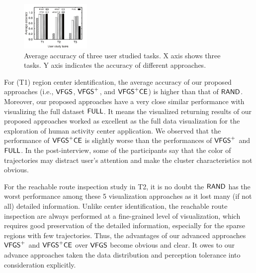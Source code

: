 \begin{figure}[t]
	\centering
	\includegraphics[width=0.3\textwidth]{pictures/userstudy}
	\vspace{-4mm}
	\caption{Average accuracy of three user studied tasks. X axis shows three tasks. Y axis indicates the accuracy of different approaches.}
	\label{fig:accuracy}
	\vspace{-6mm}
\end{figure}

For (T1) region center identification, the average accuracy of our proposed approaches (i.e., $\mathsf{VFGS}$, $\mathsf{VFGS}^{+}$, and $\mathsf{VFGS}^{+}\mathsf{CE}$) is higher than that of $\mathsf{RAND}{}$.
Moreover, our proposed approaches have a very close similar performance with visualizing the full dataset $\mathsf{FULL}$.
It means the visualized returning results of our proposed approaches worked as excellent as the full data visualization for the exploration of human activity center application.
We observed that the performance of $\mathsf{VFGS}^{+}\mathsf{CE}$ is slightly worse than the performances of $\mathsf{VFGS}^{+}$ and $\mathsf{FULL}$.
In the post-interview, some of the participants say that the color of trajectories may distract user's attention and make the cluster characteristics not obvious.



For the reachable route inspection study in T2, it is no doubt the $\mathsf{RAND}$ has the worst performance among these 5 visualization approaches as it lost many (if not all) detailed information.
Unlike center identification, the reachable route inspection are always performed at a fine-grained level of visualization,
which requires good preservation of the detailed information, especially for the sparse regions with few trajectories.
Thus, the advantages of our advanced approaches $\mathsf{VFGS}^{+}$ and $\mathsf{VFGS}^{+}\mathsf{CE}$ over $\mathsf{VFGS}$ become obvious and clear.
It owes to our advance approaches taken the data distribution and perception tolerance into consideration explicitly.

